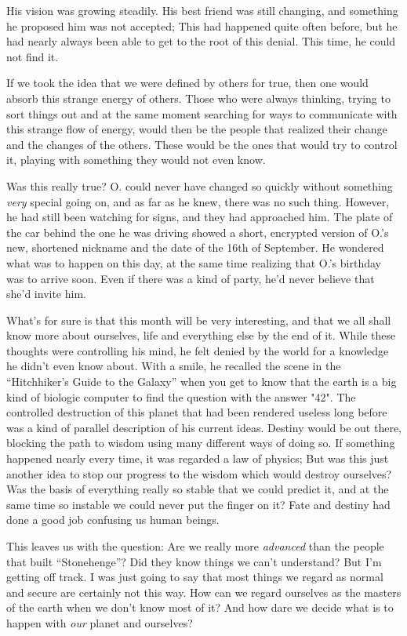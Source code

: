 His vision was growing steadily. His best friend was still changing, and something he proposed him was not accepted; This had happened quite often before, but he had nearly always been able to get to the root of this denial. This time, he could not find it.

If we took the idea that we were defined by others for true, then one would absorb this strange energy of others. Those who were always thinking, trying to sort things out and at the same moment searching for ways to communicate with this strange flow of energy, would then be the people that realized their change and the changes of the others. These would be the ones that would try to control it, playing with something they would not even know.

Was this really true? O. could never have changed so quickly without something \emph{very} special going on, and as far as he knew, there was no such thing. However, he had still been watching for signs, and they had approached him. The plate of the car behind the one he was driving showed a short, encrypted version of O.'s new, shortened nickname and the date of the 16th of September. He wondered what was to happen on this day, at the same time realizing that O.'s birthday was to arrive soon. Even if there was a kind of party, he'd never believe that she'd invite him.

What's for sure is that this month will be very interesting, and that we all shall know more about ourselves, life and everything else by the end of it. While these thoughts were controlling his mind, he felt denied by the world for a knowledge he didn't even know about. With a smile, he recalled the scene in the \enquote{Hitchhiker's Guide to the Galaxy} when you get to know that the earth is a big kind of biologic computer to find the question with the answer "42". The controlled destruction of this planet that had been rendered useless long before was a kind of parallel description of his current ideas. Destiny would be out there, blocking the path to wisdom using many different ways of doing so. If something happened nearly every time, it was regarded a law of physics; But was this just another idea to stop our progress to the wisdom which would destroy ourselves? Was the basis of everything really so stable that we could predict it, and at the same time so instable we could never put the finger on it? Fate and destiny had done a good job confusing us human beings.

This leaves us with the question: Are we really more \emph{advanced} than the people that built \enquote{Stonehenge}? Did they know things we can't understand? 
But I'm getting off track. I was just going to say that most things we regard as normal and secure are certainly not this way. How can we regard ourselves as the masters of the earth when we don't know most of it? And how dare we decide what is to happen with \emph{our} planet and ourselves?

